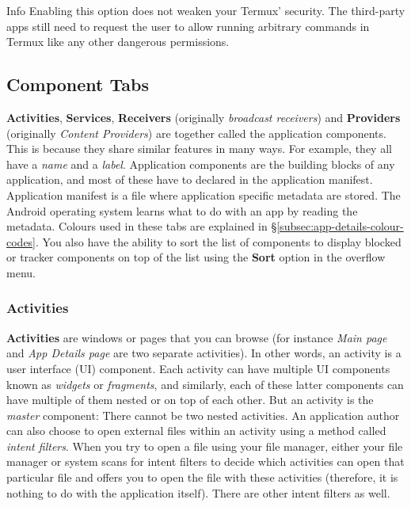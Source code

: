 \begin{tip}{Info}
    Enabling this option does not weaken your Termux' security. The third-party apps still need to request the user to
    allow running arbitrary commands in Termux like any other dangerous permissions.
\end{tip}

\subsection{Component Tabs}\label{subsec:component-tabs} %
\textbf{Activities}, \textbf{Services}, \textbf{Receivers} (originally \textit{broadcast receivers}) and
\textbf{Providers} (originally \textit{Content Providers}) are together called the application components. This is
because they share similar features in many ways. For example, they all have a \textit{name} and a \textit{label}.
Application components are the building blocks of any application, and most of these have to declared in the application
manifest. Application manifest is a file where application specific metadata are stored. The Android operating system
learns what to do with an app by reading the metadata. Colours used in these tabs are explained in
§\cref{subsec:app-details-colour-codes}. You also have the ability to sort the list of components to display blocked or
tracker components on top of the list using the \textbf{Sort} option in the overflow menu.

\subsubsection{Activities}\label{subsubsec:activities} %
\textbf{Activities} are windows or pages that you can browse (for instance \textit{Main page} and \textit{App Details
page} are two separate activities). In other words, an activity is a user interface (UI) component. Each activity can
have multiple UI components known as \textit{widgets} or \textit{fragments}, and similarly, each of these latter
components can have multiple of them nested or on top of each other. But an activity is the \textit{master} component:
There cannot be two nested activities. An application author can also choose to open external files within an activity
using a method called \textit{intent filters}. When you try to open a file using your file manager, either your file
manager or system scans for intent filters to decide which activities can open that particular file and offers you to
open the file with these activities (therefore, it is nothing to do with the application itself). There are other intent
filters as well.

